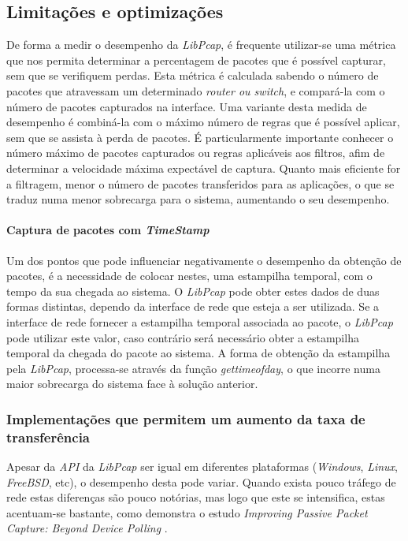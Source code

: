 \subsection{Limitações e optimizações}
De forma a medir o desempenho da \textit{LibPcap}, é frequente utilizar-se uma métrica que nos permita determinar a percentagem de pacotes que é possível capturar, sem que se verifiquem perdas.
Esta métrica é calculada sabendo o número de pacotes que atravessam um determinado \textit{router ou switch}, e compará-la com o número de pacotes capturados na interface.
Uma variante desta medida de desempenho é combiná-la com o máximo número de regras que é possível aplicar, sem que se assista à perda de pacotes.
É particularmente importante conhecer o número máximo de pacotes capturados ou regras aplicáveis aos filtros, afim de determinar a velocidade máxima expectável de captura.
Quanto mais eficiente for a filtragem, menor o número de pacotes transferidos para as aplicações, o que se traduz numa menor sobrecarga para o sistema, aumentando o seu desempenho.

\paragraph{Captura de pacotes com \textit{TimeStamp}}
Um dos pontos que pode influenciar negativamente o desempenho da obtenção de pacotes, é a necessidade de colocar nestes, uma estampilha temporal, com o tempo da sua chegada ao sistema.
O \textit{LibPcap} pode obter estes dados de duas formas distintas, dependo da interface de rede que esteja a ser utilizada.
Se a interface de rede fornecer a estampilha temporal associada ao pacote, o \textit{LibPcap} pode utilizar este valor, caso contrário será necessário obter a estampilha temporal da chegada do pacote ao sistema.
A forma de obtenção da estampilha pela \textit{LibPcap}, processa-se através da função \textit{gettimeofday}, o que incorre numa maior sobrecarga do sistema face à solução anterior.

\subsubsection{Implementações que permitem um aumento da taxa de transferência}

Apesar da \textit{API} da \textit{LibPcap} ser igual em diferentes plataformas (\textit{Windows}, \textit{Linux}, \textit{FreeBSD}, etc), o desempenho desta pode variar.
Quando exista pouco tráfego de rede estas diferenças são pouco notórias, mas logo que este se intensifica, estas acentuam-se bastante, como demonstra o estudo \textit{Improving Passive Packet Capture: Beyond Device Polling} \cite{Deri2004}.

